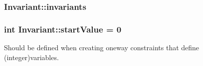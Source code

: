 \hypertarget{class_invariant_aca92a5d3c48153074a3b542ed7d8bb88}{
\subsubsection[{invariants}]{ Invariant\-::invariants\hspace{0.3cm}{\ttfamily [protected]}}}\label{class_invariant_aca92a5d3c48153074a3b542ed7d8bb88}
\hypertarget{class_invariant_a7ec1254b39fa2214a2651e366d7dd4b1}{
\subsubsection[{start\-Value}]{\setlength{\rightskip}{0pt plus 5cm}int Invariant\-::start\-Value = 0\hspace{0.3cm}{\ttfamily [protected]}}}\label{class_invariant_a7ec1254b39fa2214a2651e366d7dd4b1}


Should be defined when creating oneway constraints that define (integer)variables. 

